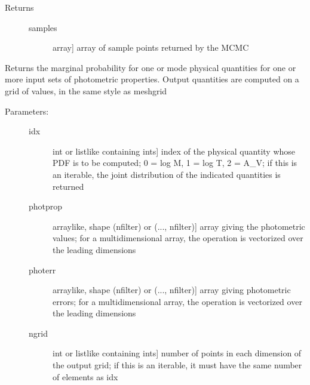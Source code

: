 \documentclass[letterpaper,10pt,english]{sphinxmanual}
\begin{document}
\begin{fulllineitems}
\begin{fulllineitems}
\begin{description}
\begin{description}
\end{description}

\item[{Returns}] \leavevmode\begin{description}
\item[{samples}] \leavevmode{[}array{]}
array of sample points returned by the MCMC

\end{description}

\end{description}

\end{fulllineitems}


\begin{fulllineitems}
\label{cluster_slug:slugpy.cluster_slug.cluster_slug.mpdf}
Returns the marginal probability for one or mode physical
quantities for one or more input sets of photometric
properties. Output quantities are computed on a grid of
values, in the same style as meshgrid
\begin{description}
\item[{Parameters:}] \leavevmode\begin{description}
\item[{idx}] \leavevmode{[}int or listlike containing ints{]}
index of the physical quantity whose PDF is to be
computed; 0 = log M, 1 = log T, 2 = A\_V; if this is an
iterable, the joint distribution of the indicated
quantities is returned

\item[{photprop}] \leavevmode{[}arraylike, shape (nfilter) or (..., nfilter){]}
array giving the photometric values; for a
multidimensional array, the operation is vectorized over
the leading dimensions

\item[{photerr}] \leavevmode{[}arraylike, shape (nfilter) or (..., nfilter){]}
array giving photometric errors; for a multidimensional
array, the operation is vectorized over the leading
dimensions

\item[{ngrid}] \leavevmode{[}int or listlike containing ints{]}
number of points in each dimension of the output grid;
if this is an iterable, it must have the same number of
elements as idx


\end{description}
\end{description}
\end{fulllineitems}
\end{fulllineitems}
\end{document}
